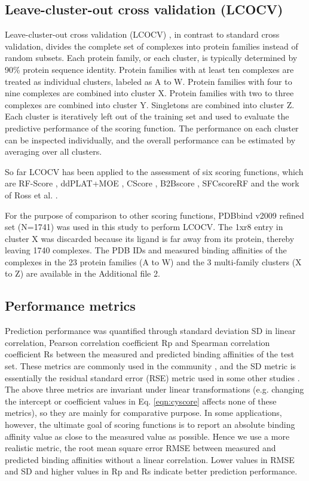 \documentclass[linenumbers]{bmcart}
\begin{document}
\subsection*{Leave-cluster-out cross validation (LCOCV)}

Leave-cluster-out cross validation (LCOCV) \cite{774}, in contrast to standard cross validation, divides the complete set of complexes into protein families instead of random subsets. Each protein family, or each cluster, is typically determined by 90\% protein sequence identity. Protein families with at least ten complexes are treated as individual clusters, labeled as A to W. Protein families with four to nine complexes are combined into cluster X. Protein families with two to three complexes are combined into cluster Y. Singletons are combined into cluster Z. Each cluster is iteratively left out of the training set and used to evaluate the predictive performance of the scoring function. The performance on each cluster can be inspected individually, and the overall performance can be estimated by averaging over all clusters.

So far LCOCV has been applied to the assessment of six scoring functions, which are RF-Score \cite{774,1194,1410}, ddPLAT+MOE \cite{1414}, CScore \cite{1194}, B2Bscore \cite{1410}, SFCscoreRF \cite{1347} and the work of Ross et al. \cite{1415}.

For the purpose of comparison to other scoring functions, PDBbind v2009 refined set (N=1741) was used in this study to perform LCOCV. The 1xr8 entry in cluster X was discarded because its ligand is far away from its protein, thereby leaving 1740 complexes. The PDB IDs and measured binding affinities of the complexes in the 23 protein families (A to W) and the 3 multi-family clusters (X to Z) are available in the Additional file 2.

\subsection*{Performance metrics}

Prediction performance was quantified through standard deviation SD in linear correlation, Pearson correlation coefficient Rp and Spearman correlation coefficient Rs between the measured and predicted binding affinities of the test set. These metrics are commonly used in the community \cite{1313}, and the SD metric is essentially the residual standard error (RSE) metric used in some other studies \cite{963}. The above three metrics are invariant under linear transformations (e.g. changing the intercept or coefficient values in Eq. \ref{eqn:cyscore} affects none of these metrics), so they are mainly for comparative purpose. In some applications, however, the ultimate goal of scoring functions is to report an absolute binding affinity value as close to the measured value as possible. Hence we use a more realistic metric, the root mean square error RMSE between measured and predicted binding affinities without a linear correlation. Lower values in RMSE and SD and higher values in Rp and Rs indicate better prediction performance.
\end{document}
